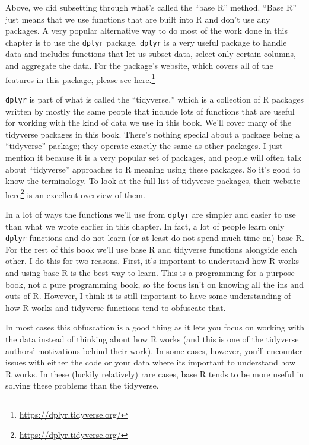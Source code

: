 \documentclass[
  a4paper,
]{krantz}
\renewcommand{\href}[2]{#2\footnote{\url{#1}}}
\begin{document}
Above, we did subsetting through what's called the ``base
R'' method. ``Base R'' just means that we use functions that
are built into R and don't use any packages. A very popular
alternative way to do most of the work done in this chapter
is to use the \texttt{dplyr} package. \texttt{dplyr} is a
very useful package to handle data and includes functions
that let us subset data, select only certain columns, and
aggregate the data. For the package's website, which covers
all of the features in this package, please see
\href{https://dplyr.tidyverse.org/}{here.}

\texttt{dplyr} is part of what is called the ``tidyverse,''
which is a collection of R packages written by mostly the
same people that include lots of functions that are useful
for working with the kind of data we use in this book. We'll
cover many of the tidyverse packages in this book. There's
nothing special about a package being a ``tidyverse''
package; they operate exactly the same as other packages. I
just mention it because it is a very popular set of
packages, and people will often talk about ``tidyverse''
approaches to R meaning using these packages. So it's good
to know the terminology. To look at the full list of
tidyverse packages, their website
\href{https://dplyr.tidyverse.org/}{here} is an excellent
overview of them.

In a lot of ways the functions we'll use from \texttt{dplyr}
are simpler and easier to use than what we wrote earlier in
this chapter. In fact, a lot of people learn only
\texttt{dplyr} functions and do not learn (or at least do
not spend much time on) base R. For the rest of this book
we'll use base R and tidyverse functions alongside each
other. I do this for two reasons. First, it's important to
understand how R works and using base R is the best way to
learn. This is a programming-for-a-purpose book, not a pure
programming book, so the focus isn't on knowing all the ins
and outs of R. However, I think it is still important to
have some understanding of how R works and tidyverse
functions tend to obfuscate that.

In most cases this obfuscation is a good thing as it lets
you focus on working with the data instead of thinking about
how R works (and this is one of the tidyverse authors'
motivations behind their work). In some cases, however,
you'll encounter issues with either the code or your data
where its important to understand how R works. In these
(luckily relatively) rare cases, base R tends to be more
useful in solving these problems than the tidyverse.
\end{document}
